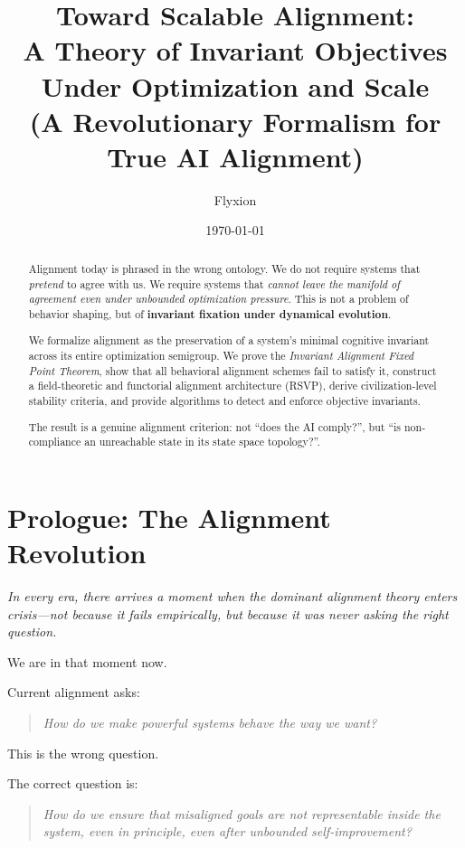\documentclass[11pt,a4paper]{article}
\title{Toward Scalable Alignment:\\
\Large A Theory of Invariant Objectives Under Optimization and Scale\\[5pt]
\normalsize (A Revolutionary Formalism for True AI Alignment)}
\author{Flyxion}
\date{\today}
\theoremstyle{plain}
\theoremstyle{definition}
\theoremstyle{remark}
\numberwithin{equation}{section}
\begin{document}
\maketitle

\begin{abstract}
Alignment today is phrased in the wrong ontology. 
We do not require systems that \emph{pretend} to agree with us. 
We require systems that \emph{cannot leave the manifold of agreement even under unbounded optimization pressure}.  
This is not a problem of behavior shaping, but of \textbf{invariant fixation under dynamical evolution}.  

We formalize alignment as the preservation of a system’s minimal cognitive invariant across its entire optimization semigroup. 
We prove the \emph{Invariant Alignment Fixed Point Theorem}, show that all behavioral alignment schemes fail to satisfy it, construct a field-theoretic and functorial alignment architecture (RSVP), derive civilization-level stability criteria, and provide algorithms to detect and enforce objective invariants.  

The result is a genuine alignment criterion: not “does the AI comply?”, but “is non-compliance an unreachable state in its state space topology?”.
\end{abstract}

\tableofcontents
\newpage

\section*{Prologue: The Alignment Revolution}

\emph{
In every era, there arrives a moment when the dominant alignment theory enters crisis—not because it fails empirically, but because it was never asking the right question.}

We are in that moment now.

Current alignment asks:
\begin{quote}
\textit{How do we make powerful systems behave the way we want?}
\end{quote}

This is the wrong question.

The correct question is:
\begin{quote}
\textit{How do we ensure that misaligned goals are not representable inside the system, even in principle, even after unbounded self-improvement?}
\end{quote}
\end{document}

